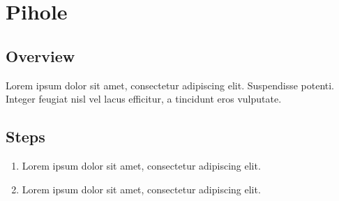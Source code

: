 \documentclass[a4paper,12pt]{article}
\begin{document}
\section{Pihole}

\subsection{Overview}
Lorem ipsum dolor sit amet, consectetur adipiscing elit. Suspendisse potenti. Integer feugiat nisl vel lacus efficitur, a tincidunt eros vulputate.

\subsection{Steps}
\begin{enumerate}
    \item Lorem ipsum dolor sit amet, consectetur adipiscing elit.
    \item Lorem ipsum dolor sit amet, consectetur adipiscing elit.
\end{enumerate}
\end{document}
